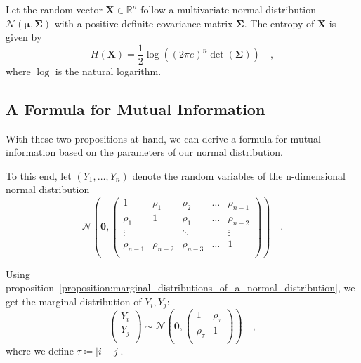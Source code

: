 \documentclass[../../main.tex]{subfiles}
\begin{document}
\begin{proposition}
    \label{proposition:entropy_of_multivariate_normal}
    Let the random vector $\bm{X} \in \mathbb{R}^n$ follow a multivariate normal distribution $\mathcal{N}(\bm{\mu}, \bm{\Sigma})$ with a positive definite covariance matrix $\bm{\Sigma}$. The entropy of $\bm{X}$ is given by
    \[
        H(\bm{X}) = \frac{1}{2} \log\left( (2\pi e)^n \det(\bm{\Sigma}) \right) \quad,
    \]
    where $\log$ is the natural logarithm.
\end{proposition}

\subsection{A Formula for Mutual Information}
With these two propositions at hand, we can derive a formula for mutual information based on the parameters of our normal distribution.

To this end, let $(Y_1, \dots, Y_n)$ denote the random variables of the n-dimensional normal distribution
\[
    \mathcal{N}\left(\bm{0}, \begin{pmatrix*}
        1& \rho_1& \rho_2& \dots & \rho_{n-1} \\
        \rho_1& 1& \rho_1& \dots & \rho_{n-2} \\
        \vdots &  & \ddots & & \vdots \\
        \rho_{n-1} & \rho_{n-2} & \rho_{n-3} & \dots & 1 \\
    \end{pmatrix*}\right) \quad .
\]

Using proposition~\ref{proposition:marginal_distributions_of_a_normal_distribution}, we get the marginal distribution of $Y_i, Y_j$:
\[
    \begin{pmatrix*}
        Y_i \\
        Y_j \\
    \end{pmatrix*}
    \sim \mathcal{N}\left(\bm{0}, \begin{pmatrix*}
        1 & \rho_\tau \\
        \rho_\tau & 1 \\
    \end{pmatrix*}\right)
    \quad ,
\]
where we define $\tau \coloneqq |i - j|$.
\end{document}
